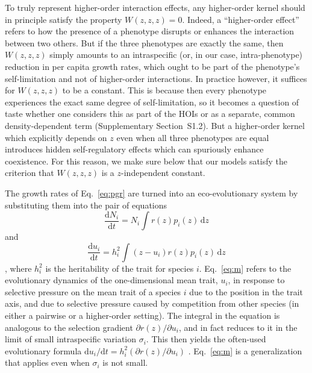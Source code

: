 \documentclass[11pt]{article}
\newcommand{\ud}{\mathrm{d}}
\newcommand{\SI}{Supplementary}
\begin{document}
To truly represent higher-order interaction effects, any higher-order kernel should in principle satisfy the property $W(z, z, z) = 0$. Indeed, a ``higher-order effect'' refers to how the presence of a phenotype disrupts or enhances the interaction between two others. But if the three phenotypes are exactly the same, then $W(z, z, z)$ simply amounts to an intraspecific (or, in our case, intra-phenotype) reduction in per capita growth rates, which ought to be part of the phenotype's self-limitation and not of higher-order interactions. In practice however, it suffices for $W(z, z, z)$ to be a constant. This is because then every phenotype experiences the exact same degree of self-limitation, so it becomes a question of taste whether one considers this as part of the HOIs or as a separate, common density-dependent term (\SI{} Section~S1.2). But a higher-order kernel which explicitly depends on $z$ even when all three phenotypes are equal introduces hidden self-regulatory effects which can spuriously enhance coexistence. For this reason, we make sure below that our models satisfy the criterion that $W(z, z, z)$ is a $z$-independent constant.

The growth rates of Eq.~\ref{eq:pgr} are turned into an eco-evolutionary system by substituting them into the pair of equations
\begin{equation}
  \label{eq:n}
  \frac{\ud N_i}{\ud t} = N_i \int r(z) p_i(z) \,\ud z
\end{equation}
and
\begin{equation}
  \label{eq:m}
  \frac{\ud u_i}{\ud t} = h_i^2 \int (z - u_i) r(z) p_i(z) \,\ud z
\end{equation}
\citep{barabas_effect_2016,pastore_evolution_2021}, where $h_i^2$ is the heritability of the trait for species $i$. Eq.~\ref{eq:m} refers to the evolutionary dynamics of the one-dimensional mean trait, $u_i$, in response to selective pressure on the mean trait of a species $i$ due to the position in the trait axis, and due to selective pressure caused by competition from other species (in either a pairwise or a higher-order setting). The integral in the equation is analogous to the selection gradient $\partial r(z) / \partial u_i$, and in fact reduces to it in the limit of small intraspecific variation $\sigma_i$. This then yields the often-used evolutionary formula $\ud u_i / \ud t = h_i^2 (\partial r(z) / \partial u_i)$ \citep[e.g.,][]{mcpeek_evolutionary_2017}. Eq.~\ref{eq:m} is a generalization that applies even when $\sigma_i$ is not small.
\end{document}
